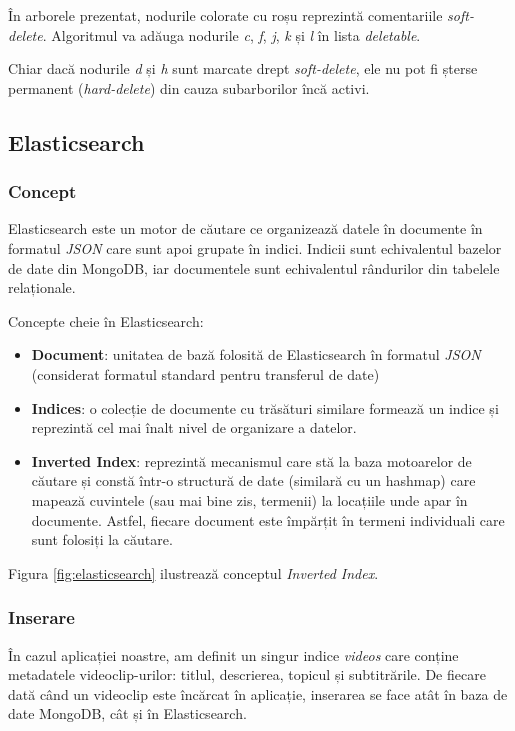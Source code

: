 \vspace{2em}

\par
În arborele prezentat, nodurile colorate cu roșu reprezintă comentariile \textit{soft-delete}. Algoritmul
va adăuga nodurile \textit{c}, \textit{f}, \textit{j}, \textit{k} și \textit{l} în lista \textit{deletable}.
\par
Chiar dacă nodurile \textit{d} și \textit{h} sunt marcate drept \textit{soft-delete}, ele nu pot fi șterse
permanent (\textit{hard-delete}) din cauza subarborilor încă activi.

\subsection{Elasticsearch}
\subsubsection{Concept}
Elasticsearch este un motor de căutare ce organizează datele în documente în formatul \textit{JSON} care
sunt apoi grupate în indici. Indicii sunt echivalentul bazelor de date din MongoDB, iar documentele sunt
echivalentul rândurilor din tabelele relaționale.

\par
Concepte cheie în Elasticsearch:
\begin{itemize}
    \item \textbf{Document}: unitatea de bază folosită de Elasticsearch în formatul \textit{JSON}
    (considerat formatul standard pentru transferul de date)
    \item \textbf{Indices}: o colecție de documente cu trăsături similare formează un indice și reprezintă
    cel mai înalt nivel de organizare a datelor.
    \item \textbf{Inverted Index}: reprezintă mecanismul care stă la baza motoarelor de căutare și constă
    într-o structură de date (similară cu un hashmap) care mapează cuvintele (sau mai bine zis, termenii)
    la locațiile unde apar în documente. Astfel, fiecare document este împărțit în termeni individuali 
    care sunt folosiți la căutare.
\end{itemize}

\par
Figura \ref{fig:elasticsearch} ilustrează conceptul \textit{Inverted Index}. \cite{elasticsearchexplained}

\subsubsection{Inserare}
\par
În cazul aplicației noastre, am definit un singur indice \textit{videos} care conține metadatele
videoclip-urilor: titlul, descrierea, topicul și subtitrările. De fiecare dată când un videoclip
este încărcat în aplicație, inserarea se face atât în baza de date MongoDB, cât și în Elasticsearch.

